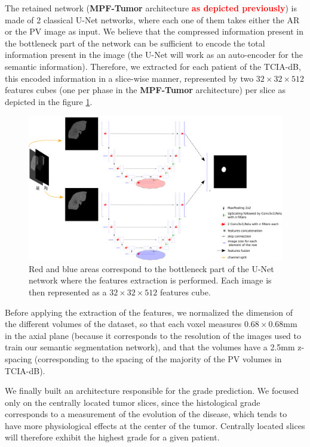 \documentclass[]{article}
\newcommand{\pplfont}[1]{{\textbf{\fontfamily{ppl}\selectfont #1}}}
\newcommand{\lmttfont}[1]{{\fontfamily{lmtt}\selectfont #1}}
\begin{document}
The retained network (\pplfont{MPF-Tumor} architecture \textcolor{red}{\textbf{as depicted previously}}) is made of 2 classical U-Net networks, where each
one of them takes either the AR or the PV image as input. We believe
that the compressed information present in the bottleneck part of the
network can be sufficient to encode the total information present in the
image (the U-Net will work as an auto-encoder for the semantic information). Therefore, we extracted for each patient of the \lmttfont{TCIA-dB}, this
encoded information in a slice-wise manner, represented by two $ 32\times32\times512 $
features cubes (one per phase in the \pplfont{MPF-Tumor} architecture) per slice
as depicted in the figure \ref{fig:MPF_Features_Selection}.


\begin{figure}[th!]
\centering
\includegraphics[width=0.95\linewidth]{images/MPF_Features_Selection}
\caption{Red and blue areas correspond to the bottleneck part of the U-Net
network where the features extraction is performed. Each image is then
represented as a $ 32\times32\times512 $ features cube.}
\label{fig:MPF_Features_Selection}
\end{figure}


Before applying the extraction of the features, we normalized
the dimension of the different volumes of the dataset, so that each
voxel measures $ 0.68\times0.68 $mm in the axial plane (because it corresponds to
the resolution of the images used to train our semantic segmentation
network), and that the volumes have a 2.5mm z-spacing (corresponding to the
spacing of the majority of the PV volumes in \lmttfont{TCIA-dB}).

We finally built an architecture responsible for the grade prediction.
We focused only on the centrally located tumor slices, since the
histological grade corresponds to a measurement of the evolution of the
disease, which tends to have more physiological effects at the center of
the tumor. Centrally located slices will therefore exhibit the highest
grade for a given patient.
\end{document}
